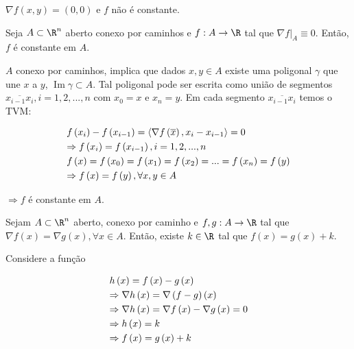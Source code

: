 \documentclass{book}
\begin{document}
$\nabla f\left( {x,y} \right) = \left( {0,0} \right)$ e $f$ n\~ao \'e constante.

\begin{teo}
    Seja $A \subset \R^n$ aberto conexo por caminhos e $f:A \to \R$ tal que $\left. {\nabla f} \right|_A  \equiv 0$. Ent\~ao, $f$ \'e constante em $A$.
\end{teo}

\begin{dem}
    $A$ conexo por caminhos, implica que dados $x,y \in A$ existe uma poligonal $\gamma$ que une $x$ a $y$, $\operatorname{Im} \gamma  \subset A$. Tal poligonal pode ser escrita como uni\~ao de segmentos $\overline {x_{i - 1} x_i } ,i = 1,2,...,n$ com $x_0 = x$ e $x_n = y$. Em cada segmento $\overline {x_{i - 1} x_i }$ temos o TVM:

\[
\begin{gathered}
  f\left( {x_i } \right) - f\left( {x_{i - 1} } \right) = \left\langle {\nabla f\left( {\overline x } \right),x_i  - x_{i - 1} } \right\rangle  = 0 \hfill \\
   \Rightarrow f\left( {x_i } \right) = f\left( {x_{i - 1} } \right),i = 1,2,...,n \hfill \\
  f\left( x \right) = f\left( {x_0 } \right) = f\left( {x_1 } \right) = f\left( {x_2 } \right) = ... = f\left( {x_n } \right) = f\left( y \right) \hfill \\
\Rightarrow f\left( x \right) = f\left( y \right),\forall x,y \in A \hfill \\
\end{gathered}
\]

$\Rightarrow f$ \'e constante em $A$.

\end{dem}

\begin{cor}
    Sejam $A \subset \R^n$ aberto, conexo por caminho e $f,g:A \to \R$ tal que $\nabla f\left( x \right) = \nabla g\left( x \right),\forall x \in A$. Ent\~ao, existe $k \in \R$ tal que $f(x) = g(x) + k$.
\end{cor}

\begin{dem}
Considere a fun\c c\~ao

\[
\begin{gathered}
h\left( x \right) = f\left( x \right) - g\left( x \right) \hfill \\
   \Rightarrow \nabla h\left( x \right) = \nabla \left( {f - g} \right)\left( x \right) \hfill \\
   \Rightarrow \nabla h\left( x \right) = \nabla f\left( x \right) - \nabla g\left( x \right) = 0 \hfill \\
\Rightarrow h\left( x \right) = k \hfill \\
\Rightarrow f\left( x \right) = g\left( x \right) + k \hfill \\
\end{gathered}
\]

\end{dem}
\end{document}
